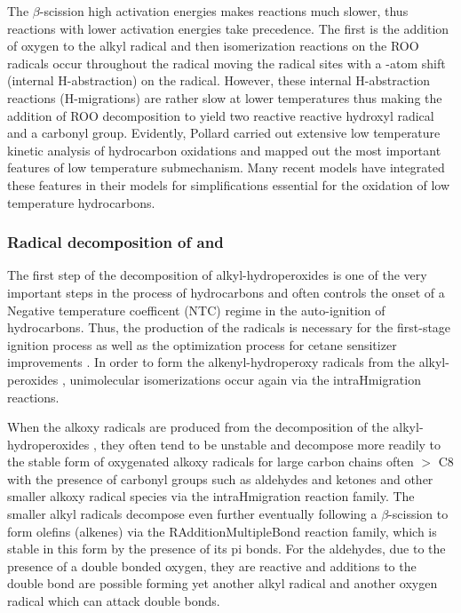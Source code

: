The $\beta$-scission high activation energies makes reactions much slower, thus reactions with lower activation energies take precedence. The first is the addition of oxygen  to the alkyl radical and then isomerization reactions on the ROO radicals occur throughout the radical moving the radical sites with a -atom shift (internal H-abstraction) on the radical. 
 However, these internal H-abstraction reactions (H-migrations) are rather slow at lower temperatures thus making the addition of ROO decomposition to yield two reactive reactive hydroxyl radical and a carbonyl group. Evidently, Pollard \cite{Pollard1977Hydrocarbons} carried out extensive low temperature kinetic analysis of hydrocarbon oxidations and mapped out the most important features of low temperature submechanism. Many recent models have integrated these features in their models for simplifications essential for the oxidation of low temperature hydrocarbons. 



\subsubsection{Radical decomposition of  and  }
The first step of the decomposition of  alkyl-hydroperoxides is one of the very important steps in the process of hydrocarbons and often controls the onset of a Negative temperature coefficent (NTC) regime in the auto-ignition of hydrocarbons. Thus, the production of the  radicals is necessary for the first-stage ignition process \cite{Merchant2015UnderstandingPropane} as well as the optimization process for cetane sensitizer improvements \cite{Curran1998AOxidation}. In order to form the alkenyl-hydroperoxy radicals  from the alkyl-peroxides , unimolecular isomerizations occur again via the intra\textunderscore H\textunderscore migration reactions. 

When the alkoxy radicals are produced  from the decomposition of the alkyl-hydroperoxides , they often tend to be unstable and decompose more readily to the stable form of oxygenated alkoxy radicals for large carbon chains often $>$ C8 with the presence of carbonyl groups such as aldehydes and ketones and other smaller alkoxy radical species via the intra\textunderscore H\textunderscore migration reaction family. The smaller alkyl radicals decompose even further eventually following a $\beta$-scission to form olefins (alkenes) via the R\textunderscore Addition\textunderscore MultipleBond reaction family, which is stable in this form by the presence of its pi bonds. For the aldehydes, due to the presence of a double bonded oxygen, they are reactive and additions to the double bond are possible forming yet another alkyl radical and another oxygen radical which can attack double bonds. 


